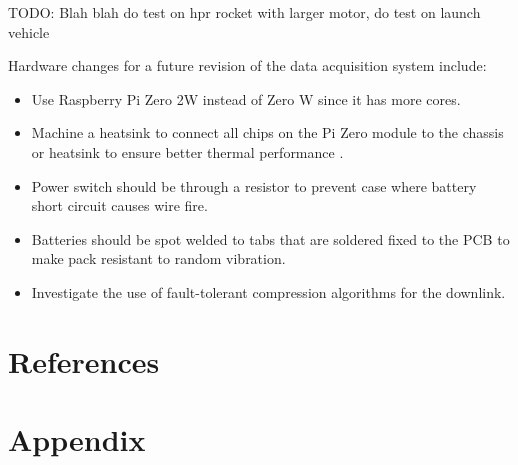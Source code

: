 \documentclass{report}
\begin{document}
TODO: Blah blah do test on hpr rocket with larger motor, do test on launch vehicle

Hardware changes for a future revision of the data acquisition system include:

\begin{itemize}
  \item Use Raspberry Pi Zero 2W instead of Zero W since it has more cores.
  \item Machine a heatsink to connect all chips on the Pi Zero module to the chassis or heatsink to ensure better thermal performance \cite{guertin2022raspberry}.
  \item Power switch should be through a resistor to prevent case where battery short circuit causes wire fire.
  \item Batteries should be spot welded to tabs that are soldered fixed to the PCB to make pack resistant to random vibration.
  \item Investigate the use of fault-tolerant compression algorithms for the downlink. %
\end{itemize}

\newpage

\section{References}

\printbibliography[heading=none]

\section{Appendix}
\end{document}
